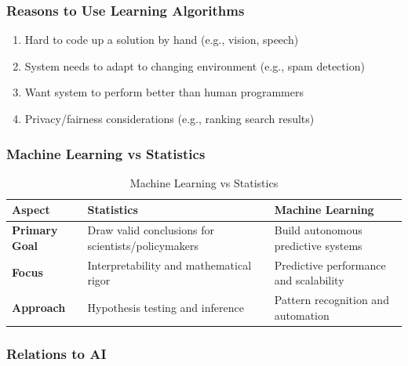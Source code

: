 \subsubsection{Reasons to Use Learning Algorithms}
\label{subsubsec:reasons-learning-algorithms}

\begin{enumerate}
\item Hard to code up a solution by hand (e.g., vision, speech)
\item System needs to adapt to changing environment (e.g., spam detection)
\item Want system to perform better than human programmers
\item Privacy/fairness considerations (e.g., ranking search results)
\end{enumerate}

\subsubsection{Machine Learning vs Statistics}
\label{subsubsec:ml-vs-statistics}

\begin{table}[h!]
\centering
\begin{tabular}{|p{3cm}|p{5cm}|p{5cm}|}
\hline
\textbf{Aspect} & \textbf{Statistics} & \textbf{Machine Learning} \\
\hline
\textbf{Primary Goal} & Draw valid conclusions for scientists/policymakers & Build autonomous predictive systems \\
\hline
\textbf{Focus} & Interpretability and mathematical rigor & Predictive performance and scalability \\
\hline
\textbf{Approach} & Hypothesis testing and inference & Pattern recognition and automation \\
\hline
\end{tabular}
\caption{Machine Learning vs Statistics}
\label{tab:ml-vs-statistics}
\end{table}

\subsubsection{Relations to AI}
\label{subsubsec:relations-to-ai}

